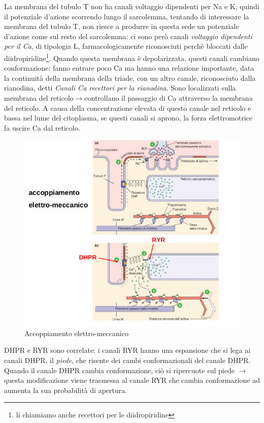 \documentclass[a4paper,12pt]{article}
\newcommand{\lfreccia}{\ensuremath{\longrightarrow}}
\begin{document}
La membrana del tubulo T non ha canali voltaggio dipendenti per Na e K, quindi il potenziale d'azione scorrendo lungo il sarcolemma, tentando di interessare la membrana del tubulo T, non riesce a produrre in questa sede un potenziale d'azione come sul resto del sarcolemma: ci sono però canali \emph{voltaggio dipendenti per il Ca}, di tipologia L, farmacologicamente riconosciuti perchè bloccati dalle diidropiridine\footnote{li chiamiamo anche recettori per le diidropiridine}. Quando questa membrana è depolarizzata, questi canali cambiano conformazione: fanno entrare poco Ca ma hanno una relazione importante, data la continuità della membrana della triade, con un altro canale, riconosciuto dalla rianodina, detti \emph{Canali Ca recettori per la rianodina}. Sono localizzati sulla membrana del reticolo\lfreccia controllano il passaggio di Ca attraverso la membrana del reticolo. A causa della concentrazione elevata di questo canale nel reticolo e bassa nel lume del citoplasma, se questi canali si aprono, la forza elettromotrice fa uscire Ca dal reticolo.
\begin{figure}[H]
\centering
\includegraphics[scale=0.4]{immagine/ryr.jpg}
\caption{Accoppiamento elettro-meccanico}
\end{figure}
DHPR e RYR sono correlate: i canali RYR hanno una espansione che si lega ai canali DHPR, il \emph{piede}, che risente dei cambi conformazionali del canale DHPR. Quando il canale DHPR cambia conformazione, ciò si ripercuote sul piede \lfreccia questa modificazione viene trasmessa al canale RYR che cambia conformazione ad aumenta la sua probabilità di apertura.
\end{document}
